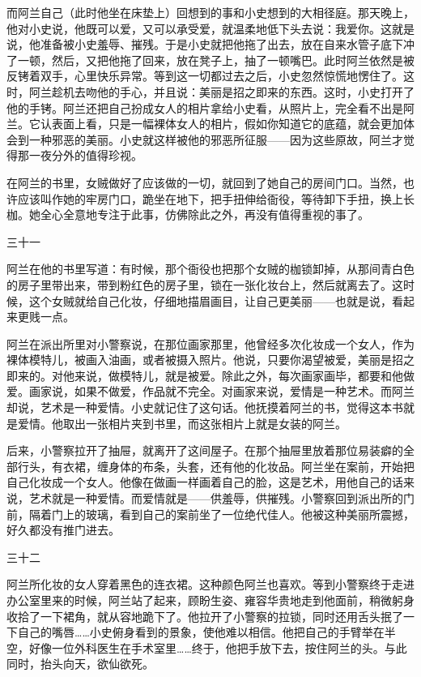 而阿兰自己（此时他坐在床垫上）回想到的事和小史想到的大相径庭。那天晚上，他对小史说，他既可以爱，又可以承受爱，就温柔地低下头去说：我爱你。这就是说，他准备被小史羞辱、摧残。于是小史就把他拖了出去，放在自来水管子底下冲了一顿，然后，又把他拖了回来，放在凳子上，抽了一顿嘴巴。此时阿兰依然是被反铐着双手，心里快乐异常。等到这一切都过去之后，小史忽然惊慌地愣住了。这时，阿兰趁机去吻他的手心，并且说：美丽是招之即来的东西。这时，小史打开了他的手铐。阿兰还把自己扮成女人的相片拿给小史看，从照片上，完全看不出是阿兰。它认表面上看，只是一幅裸体女人的相片，假如你知道它的底蕴，就会更加体会到一种邪恶的美丽。小史就这样被他的邪恶所征服——因为这些原故，阿兰才觉得那一夜分外的值得珍视。 

在阿兰的书里，女贼做好了应该做的一切，就回到了她自己的房间门口。当然，也许应该叫作她的牢房门口，跪坐在地下，把手扭伸给衙役，等待卸下手扭，换上长枷。她全心全意地专注于此事，仿佛除此之外，再没有值得重视的事了。 

三十一 

阿兰在他的书里写道：有时候，那个衙役也把那个女贼的枷锁卸掉，从那间青白色的房子里带出来，带到粉红色的房子里，锁在一张化妆台上，然后就离去了。这时候，这个女贼就给自己化妆，仔细地描眉画目，让自己更美丽——也就是说，看起来更贱一点。 

阿兰在派出所里对小警察说，在那位画家那里，他曾经多次化妆成一个女人，作为裸体模特儿，被画入油画，或者被摄入照片。他说，只要你渴望被爱，美丽是招之即来的。对他来说，做模特儿，就是被爱。除此之外，每次画家画毕，都要和他做爱。画家说，如果不做爱，作品就不完全。对画家来说，爱情是一种艺术。而阿兰却说，艺术是一种爱情。小史就记住了这句话。他抚摸着阿兰的书，觉得这本书就是爱情。他取出一张相片夹到书里，而这张相片上就是女装的阿兰。 

后来，小警察拉开了抽屉，就离开了这间屋子。在那个抽屉里放着那位易装癖的全部行头，有衣裙，缠身体的布条，头套，还有他的化妆品。阿兰坐在案前，开始把自己化妆成一个女人。他像在做画一样画着自己的脸，这是艺术，用他自己的话来说，艺术就是一种爱情。而爱情就是——供羞辱，供摧残。小警察回到派出所的门前，隔着门上的玻璃，看到自己的案前坐了一位绝代佳人。他被这种美丽所震撼，好久都没有推门进去。 

三十二 

阿兰所化妆的女人穿着黑色的连衣裙。这种颜色阿兰也喜欢。等到小警察终于走进办公室里来的时候，阿兰站了起来，顾盼生姿、雍容华贵地走到他面前，稍微躬身收拾了一下裙角，就从容地跪下了。他拉开了小警察的拉锁，同时还用舌头抿了一下自己的嘴唇……小史俯身看到的景象，使他难以相信。他把自己的手臂举在半空，好像一位外科医生在手术室里……终于，他把手放下去，按住阿兰的头。与此同时，抬头向天，欲仙欲死。 

